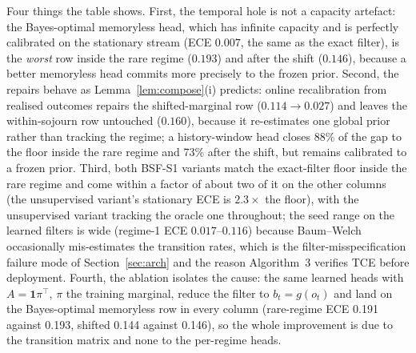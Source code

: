 \documentclass[11pt,a4paper]{article}
\numberwithin{equation}{section}
\theoremstyle{plain}
\theoremstyle{definition}
\theoremstyle{remark}
\begin{document}
Four things the table shows. First, the temporal hole is not a capacity artefact: the Bayes-optimal memoryless head, which has infinite capacity and is perfectly calibrated on the stationary stream (ECE $0.007$, the same as the exact filter), is the \emph{worst} row inside the rare regime ($0.193$) and after the shift ($0.146$), because a better memoryless head commits more precisely to the frozen prior. Second, the repairs behave as Lemma~\ref{lem:compose}(i) predicts: online recalibration from realised outcomes repairs the shifted-marginal row ($0.114\to0.027$) and leaves the within-sojourn row untouched ($0.160$), because it re-estimates one global prior rather than tracking the regime; a history-window head closes 88\% of the gap to the floor inside the rare regime and 73\% after the shift, but remains calibrated to a frozen prior. Third, both BSF-S1 variants match the exact-filter floor inside the rare regime and come within a factor of about two of it on the other columns (the unsupervised variant's stationary ECE is $2.3\times$ the floor), with the unsupervised variant tracking the oracle one throughout; the seed range on the learned filters is wide (regime-1 ECE $0.017$--$0.116$) because Baum--Welch occasionally mis-estimates the transition rates, which is the filter-misspecification failure mode of Section~\ref{sec:arch} and the reason Algorithm~3 verifies TCE before deployment. Fourth, the ablation isolates the cause: the same learned heads with $A=\mathbf 1\pi^\top$, $\pi$ the training marginal, reduce the filter to $b_t=g(o_t)$ and land on the Bayes-optimal memoryless row in every column (rare-regime ECE 0.191 against 0.193, shifted 0.144 against 0.146), so the whole improvement is due to the transition matrix and none to the per-regime heads.
\end{document}
